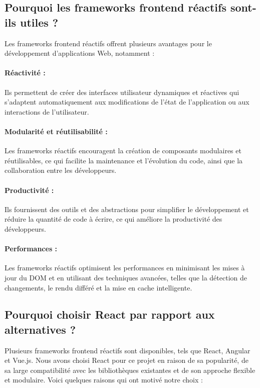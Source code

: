 \subsection{Pourquoi les frameworks frontend réactifs sont-ils utiles ?}

Les frameworks frontend réactifs offrent plusieurs avantages pour le développement d'applications Web, notamment :

\paragraph{Réactivité :} Ils permettent de créer des interfaces utilisateur dynamiques et réactives qui s'adaptent automatiquement aux modifications de l'état de l'application ou aux interactions de l'utilisateur.
\paragraph{Modularité et réutilisabilité :} Les frameworks réactifs encouragent la création de composants modulaires et réutilisables, ce qui facilite la maintenance et l'évolution du code, ainsi que la collaboration entre les développeurs.
\paragraph{Productivité :} Ils fournissent des outils et des abstractions pour simplifier le développement et réduire la quantité de code à écrire, ce qui améliore la productivité des développeurs.
\paragraph{Performances :} Les frameworks réactifs optimisent les performances en minimisant les mises à jour du DOM et en utilisant des techniques avancées, telles que la détection de changements, le rendu différé et la mise en cache intelligente.

\subsection{Pourquoi choisir React par rapport aux alternatives ?}

Plusieurs frameworks frontend réactifs sont disponibles, tels que React, Angular et Vue.js. Nous avons choisi React\cite{QuickStartReact} pour ce projet en raison de sa popularité, de sa large compatibilité avec les bibliothèques existantes et de son approche flexible et modulaire. Voici quelques raisons qui ont motivé notre choix :

